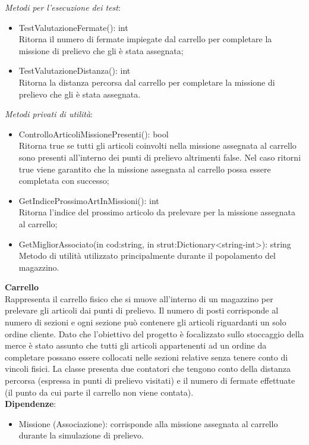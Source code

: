 \textit{Metodi per l'esecuzione dei test}:
\begin{itemize}
    \item TestValutazioneFermate(): int\\
    Ritorna il numero di fermate impiegate dal carrello per completare la missione di prelievo che gli è stata assegnata;
    \item TestValutazioneDistanza(): int\\
    Ritorna la distanza percorsa dal carrello per completare la missione di prelievo che gli è stata assegnata.\\
\end{itemize}
\textit{Metodi privati di utilità}:
\begin{itemize}
    \item ControlloArticoliMissionePresenti(): bool\\
    Ritorna true se tutti gli articoli coinvolti nella missione assegnata al carrello sono presenti all'interno dei punti di prelievo altrimenti false.
    Nel caso ritorni true viene garantito che la missione assegnata al carrello possa essere completata con successo;
    \item GetIndiceProssimoArtInMissioni(): int\\
    Ritorna l'indice del prossimo articolo da prelevare per la missione assegnata al carrello;
    \item GetMigliorAssociato(in cod:string, in strut:Dictionary<string-int>): string\\
    Metodo di utilità utilizzato principalmente durante il popolamento del magazzino.\\
\end{itemize}       
\textbf{Carrello}\\
Rappresenta il carrello fisico che si muove all'interno di un magazzino per prelevare gli articoli dai punti di prelievo.
Il numero di posti corrisponde al numero di sezioni e ogni sezione può contenere gli articoli riguardanti un solo ordine cliente.
Dato che l'obiettivo del progetto è focalizzato sullo stoccaggio della merce è stato assunto che tutti gli articoli appartenenti ad un ordine 
da completare possano essere collocati nelle sezioni relative senza tenere conto di vincoli fisici.
La classe presenta due contatori che tengono conto della distanza percorsa (espressa in punti di prelievo visitati) e il numero di fermate effettuate
(il punto da cui parte il carrello non viene contata).\\
\textbf{Dipendenze}:
\begin{itemize}
    \item Missione (Associazione): corrisponde alla missione assegnata al carrello durante la simulazione di prelievo.\\
\end{itemize}
